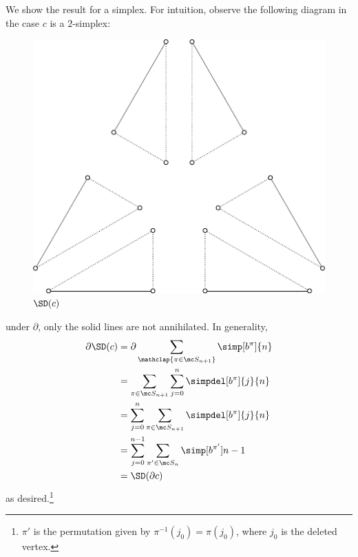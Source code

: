 \begin{solution}
  We show the result for a simplex. For intuition, observe the following
  diagram in the case $c$ is a $2$-simplex:
  \begin{figure}[H]
    \centering
    \includegraphics{figures/offset-barycentric-1.pdf}
    \caption{$\SD(c)$}
  \end{figure}
  under $\partial$, only the solid lines are not annihilated. In generality,
  \begin{align*}
    \partial \SD(c)
    &= \partial\sum_{\mathclap{\pi \in \mc S_{n+1}}} \simp[b^\pi]{n} \\
    &= \sum_{\pi \in \mc S_{n+1}} \sum_{j=0}^n \simpdel[b^\pi]{j}{n} \\
    &= \sum_{j=0}^n \sum_{\pi \in \mc S_{n+1}} \simpdel[b^\pi]{j}{n} \\
    &= \sum_{j=0}^{n-1} \sum_{\pi' \in \mc S_{n}} \simp[b^{\pi'}]{n-1} \\
    &= \SD(\partial c)
  \end{align*}
  as desired.\footnote{$\pi'$ is the permutation given by $\pi^{-1}(j_0) =
    \pi(j_0)$, where $j_0$ is the deleted vertex.}
\end{solution}

